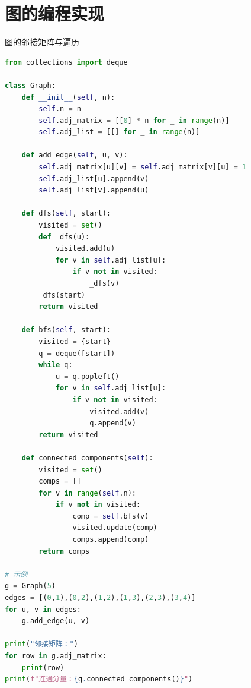 \section{图的编程实现}

\begin{mycode}{图的邻接矩阵与遍历}
\begin{lstlisting}[language=Python]
from collections import deque

class Graph:
    def __init__(self, n):
        self.n = n
        self.adj_matrix = [[0] * n for _ in range(n)]
        self.adj_list = [[] for _ in range(n)]

    def add_edge(self, u, v):
        self.adj_matrix[u][v] = self.adj_matrix[v][u] = 1
        self.adj_list[u].append(v)
        self.adj_list[v].append(u)

    def dfs(self, start):
        visited = set()
        def _dfs(u):
            visited.add(u)
            for v in self.adj_list[u]:
                if v not in visited:
                    _dfs(v)
        _dfs(start)
        return visited

    def bfs(self, start):
        visited = {start}
        q = deque([start])
        while q:
            u = q.popleft()
            for v in self.adj_list[u]:
                if v not in visited:
                    visited.add(v)
                    q.append(v)
        return visited

    def connected_components(self):
        visited = set()
        comps = []
        for v in range(self.n):
            if v not in visited:
                comp = self.bfs(v)
                visited.update(comp)
                comps.append(comp)
        return comps

# 示例
g = Graph(5)
edges = [(0,1),(0,2),(1,2),(1,3),(2,3),(3,4)]
for u, v in edges:
    g.add_edge(u, v)

print("邻接矩阵：")
for row in g.adj_matrix:
    print(row)
print(f"连通分量：{g.connected_components()}")
\end{lstlisting}
\end{mycode}

